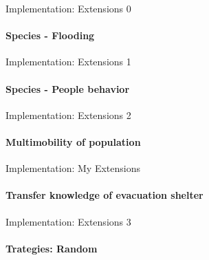 \documentclass{beamer}
\begin{document}
\begin{frame}[fragile]{Implementation: Extensions 0}
\framesubtitle{Species - Flooding}



\end{frame}

\begin{frame}[fragile]{Implementation: Extensions 1}
\framesubtitle{Species - People behavior}


\end{frame}


\begin{frame}[fragile]{Implementation: Extensions 2}
\framesubtitle{Multimobility of population}


\end{frame}

\begin{frame}[fragile]{Implementation: My Extensions}
\framesubtitle{Transfer knowledge of evacuation shelter}
    
    
\end{frame}

\begin{frame}[fragile]{Implementation: Extensions 3}
\framesubtitle{Trategies: Random}
    

\end{frame}
\end{document}

